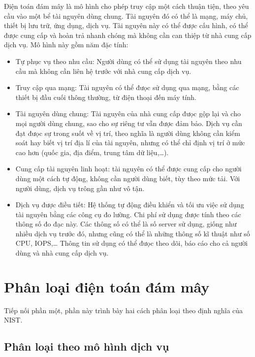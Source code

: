 \documentclass{article}
\begin{document}
Điện toán đám mây là mô hình cho phép truy cập một cách thuận tiện, theo yêu cầu
vào một bể tài nguyên dùng chung. Tài nguyên đó có thể là mạng, máy chủ, thiết
bị lưu trữ, ứng dụng, dịch vụ. Tài nguyên này có thể được cấu hình, có thể được
cung cấp và hoàn trả nhanh chóng mà không cần can thiệp từ nhà cung cấp dịch vụ.
Mô hình này gồm năm đặc tính:

\begin{itemize}
    \item Tự phục vụ theo nhu cầu: Người dùng có thể sử dụng tài nguyên theo nhu
        cầu mà không cần liên hệ trước với nhà cung cấp dịch vụ.
    \item Truy cập qua mạng: Tài nguyên có thể đưọc sử dụng qua mạng, bằng các
        thiết bị đầu cuối thông thường, từ điện thoại đến máy tính.
    \item Tài nguyên dùng chung: Tài nguyên của nhà cung cấp đưọc gộp lại và cho
        mọi người dùng chung, sao cho sự riêng tư vẫn được đảm bảo. Dịch vụ cần
        đạt đưọc sự trong suốt về vị trí, theo nghĩa là người dùng không cần
        kiểm soát hay biết vị trí địa lí của tài nguyên, nhưng có thể chỉ định
        vị trí ở mức cao hơn (quốc gia, địa điểm, trung tâm dữ liệu,\ldots).
    \item Cung cấp tài nguyên linh hoạt: tài nguyên có thể được cung cấp cho
        người dùng một cách tự động, không cần người dùng biết, tùy theo mức
        tải. Với người dùng, dịch vụ trông gần như vô tận.
    \item Dịch vụ được điều tiết: Hệ thống tự động điều khiển và tối ưu việc sử
        dụng tài nguyên bằng các công cụ đo lường. Chi phí sử dụng được tính
        theo các thông số đo đạc này. Các thông số có thể là số server sử dụng,
        giống như nhiều dịch vụ trước đó, nhưng cũng có thể là những thông số kĩ
        thuật như số CPU, IOPS,\ldots{} Thông tin sử dụng có thể đưọc theo dõi,
        báo cáo cho cả người dùng và nhà cung cấp dịch vụ.
\end{itemize}

\section{Phân loại điện toán đám mây}

Tiếp nối phần một, phần này trình bày hai cách phân loại theo định nghĩa của
NIST\@.

\subsection{Phân loại theo mô hình dịch vụ}
\end{document}
